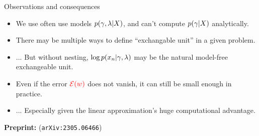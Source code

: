 
\begin{frame}{Observations and consequences}


\begin{minipage}{0.38\textwidth}
    \ElectionData{}
\end{minipage}
\begin{minipage}{0.38\textwidth}
    \ElectionResultsGlobal{}
\end{minipage}



%
\begin{itemize}
\item We use often use models $p(\gamma, \lambda \vert X)$, and can't 
      compute $p(\gamma \vert X)$ analytically.
\item There may be multiple ways to define ``exchangable unit'' in a given
      problem.
\item[] ... But without nesting,
        $\log p(x_n \vert \gamma, \lambda)$
        may be the natural model-free exchangeable unit.
\item Even if the error $\textcolor{red}{\mathcal{E}(w)}$ does not vanish,
      it can still be small enough in practice.
      \item[] ... Especially given the linear approximation's huge computational advantage.
\end{itemize}
%
\textbf{Preprint: }\citet{giordano:2023:bayesij} (\texttt{arXiv:2305.06466})

    
\end{frame}



